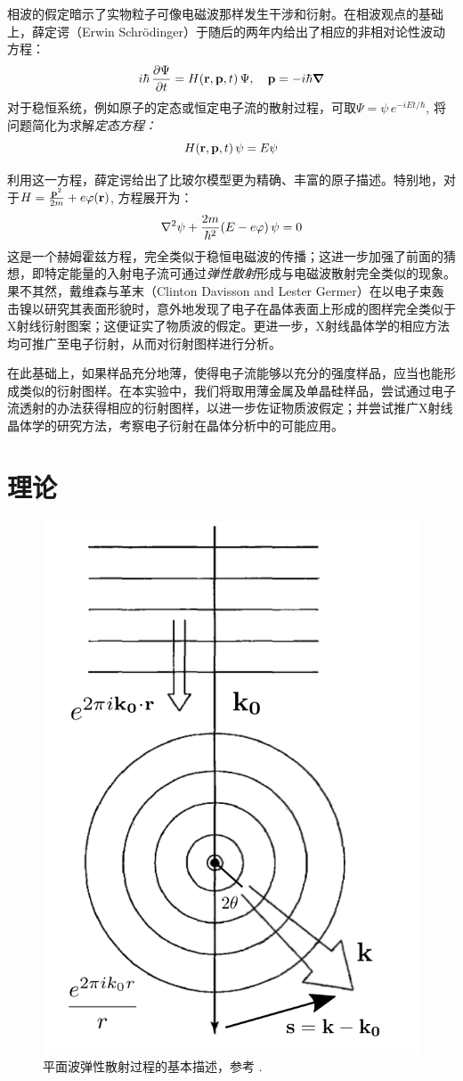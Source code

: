 \documentclass[aps,pre,12pt,preprint,%
	onecolumn,showpacs,showkeys,nofootinbib]{revtex4-1}
\begin{document}
	相波的假定暗示了实物粒子可像电磁波那样发生干涉和衍射。在相波观点的基础上，薛定谔（Erwin Schrödinger）于随后的两年内给出了相应的非相对论性波动方程：
	\begin{equation}
		i\hbar\,\pdv{\Psi}{t} = H\pqty{\vb{r},\vb{p},t}\,\Psi,\quad
		\vb{p} = -i\hbar\grad
	\end{equation}
	对于稳恒系统，例如原子的定态或恒定电子流的散射过程，可取$\Psi = \psi\,e^{-iEt/\hbar}$, 将问题简化为求解\textit{定态方程：}
	\begin{equation}
		H\pqty{\vb{r},\vb{p},t}\,\psi = E\psi
	\end{equation}
	
	利用这一方程，薛定谔给出了比玻尔模型更为精确、丰富的原子描述。特别地，对于$H = \frac{\vb{p}^2}{2m} + e\varphi(\vb{r})$, 方程展开为：
	\begin{equation}
		\laplacian{\psi}
			+ \frac{2m}{\hbar^2} \pqty{E - e\varphi}\,\psi = 0
	\end{equation}
	这是一个赫姆霍兹方程，完全类似于稳恒电磁波的传播；这进一步加强了前面的猜想，即特定能量的入射电子流可通过\textit{弹性散射}形成与电磁波散射完全类似的现象。果不其然，戴维森与革末（Clinton Davisson and Lester Germer）在以电子束轰击镍以研究其表面形貌时，意外地发现了电子在晶体表面上形成的图样完全类似于X射线衍射图案\supercite{davisson1927diffraction}；这便证实了物质波的假定。更进一步，X射线晶体学的相应方法均可推广至电子衍射，从而对衍射图样进行分析。
	
	在此基础上，如果样品充分地薄，使得电子流能够以充分的强度样品，应当也能形成类似的衍射图样。在本实验中，我们将取用薄金属及单晶硅样品，尝试通过电子流透射的办法获得相应的衍射图样，以进一步佐证物质波假定；并尝试推广X射线晶体学的研究方法，考察电子衍射在晶体分析中的可能应用。\vspace{3ex}
\section{理论}
	\begin{figure}[!h]
	\centering\vspace{-1\baselineskip}
	\includegraphics[width=.5\linewidth]{Scattering.png}
	\caption{平面波弹性散射过程的基本描述，参考 \cite{griffiths2016introduction}. }
	\end{figure}
	
\end{document}
